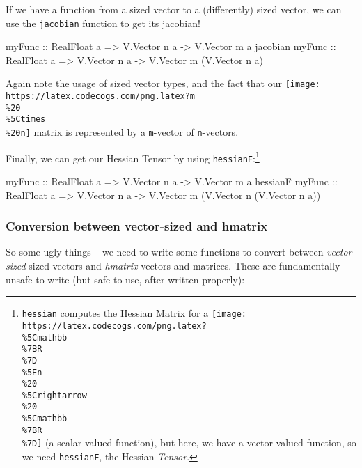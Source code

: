 \documentclass[]{article}
\newenvironment{Shaded}{}{}
\newcommand{\DataTypeTok}[1]{\textcolor[rgb]{0.56,0.13,0.00}{#1}}
\newcommand{\OtherTok}[1]{\textcolor[rgb]{0.00,0.44,0.13}{#1}}
\newcommand{\NormalTok}[1]{#1}
\begin{document}
If we have a function from a sized vector to a (differently) sized vector, we
can use the \texttt{jacobian} function to get its jacobian!

\begin{Shaded}
\begin{Highlighting}[]
\OtherTok{myFunc          ::} \DataTypeTok{RealFloat}\NormalTok{ a }\OtherTok{=>} \DataTypeTok{V.Vector}\NormalTok{ n a }\OtherTok{->} \DataTypeTok{V.Vector}\NormalTok{ m a}
\NormalTok{jacobian}\OtherTok{ myFunc ::} \DataTypeTok{RealFloat}\NormalTok{ a }\OtherTok{=>} \DataTypeTok{V.Vector}\NormalTok{ n a }\OtherTok{->} \DataTypeTok{V.Vector}\NormalTok{ m (}\DataTypeTok{V.Vector}\NormalTok{ n a)}
\end{Highlighting}
\end{Shaded}

Again note the usage of sized vector types, and the fact that our
\texttt{[image: https://latex.codecogs.com/png.latex?m\\\%20\\\%5Ctimes\\\%20n]}
matrix is represented by a \texttt{m}-vector of \texttt{n}-vectors.

Finally, we can get our Hessian Tensor by using \texttt{hessianF}:\footnote{\texttt{hessian}
  computes the Hessian Matrix for a
  \texttt{[image: https://latex.codecogs.com/png.latex?\\\%5Cmathbb\\\%7BR\\\%7D\\\%5En\\\%20\\\%5Crightarrow\\\%20\\\%5Cmathbb\\\%7BR\\\%7D]}
  (a scalar-valued function), but here, we have a vector-valued function, so we
  need \texttt{hessianF}, the Hessian \emph{Tensor}.}

\begin{Shaded}
\begin{Highlighting}[]
\NormalTok{myFunc}
\OtherTok{    ::} \DataTypeTok{RealFloat}\NormalTok{ a }\OtherTok{=>} \DataTypeTok{V.Vector}\NormalTok{ n a }\OtherTok{->} \DataTypeTok{V.Vector}\NormalTok{ m a}
\NormalTok{hessianF myFunc}
\OtherTok{    ::} \DataTypeTok{RealFloat}\NormalTok{ a }\OtherTok{=>} \DataTypeTok{V.Vector}\NormalTok{ n a }\OtherTok{->} \DataTypeTok{V.Vector}\NormalTok{ m (}\DataTypeTok{V.Vector}\NormalTok{ n (}\DataTypeTok{V.Vector}\NormalTok{ n a))}
\end{Highlighting}
\end{Shaded}

\subsubsection{Conversion between vector-sized and
hmatrix}\label{conversion-between-vector-sized-and-hmatrix}

So some ugly things -- we need to write some functions to convert between
\emph{vector-sized} sized vectors and \emph{hmatrix} vectors and matrices. These
are fundamentally unsafe to write (but safe to use, after written properly):
\end{document}
